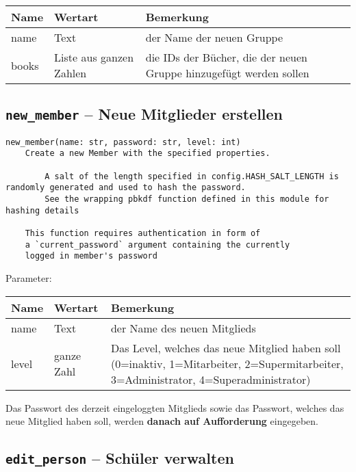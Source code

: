 \begin{tabular}{|p{}|p{}|p{}|}
Name & Wertart & Bemerkung\\
\hline
name & Text & der Name der neuen Gruppe\\
books & Liste aus ganzen Zahlen & die IDs der Bücher, die der neuen Gruppe hinzugefügt werden sollen  \\
\end{tabular}

\subsection{\texttt{new\_member} -- Neue Mitglieder erstellen}
\label{subsec:command_list:new_member}

\begin{verbatim}
new_member(name: str, password: str, level: int)
    Create a new Member with the specified properties.

        A salt of the length specified in config.HASH_SALT_LENGTH is randomly generated and used to hash the password.
        See the wrapping pbkdf function defined in this module for hashing details

    This function requires authentication in form of
    a `current_password` argument containing the currently
    logged in member's password
\end{verbatim}

Parameter:

\begin{tabular}{|p{}|p{}|p{}|}
Name & Wertart & Bemerkung\\
\hline
name & Text & der Name des neuen Mitglieds\\
level & ganze Zahl & Das Level, welches das neue Mitglied haben soll (0=inaktiv, 1=Mitarbeiter, 2=Supermitarbeiter, 3=Administrator, 4=Superadministrator)  \\
\end{tabular}

Das Passwort des derzeit eingeloggten Mitglieds sowie das Passwort, welches das neue Mitglied haben soll, werden \textbf{danach auf Aufforderung} eingegeben.

\subsection{\texttt{edit\_person} -- Schüler verwalten}
\label{subsec:command_list:edit_person}

